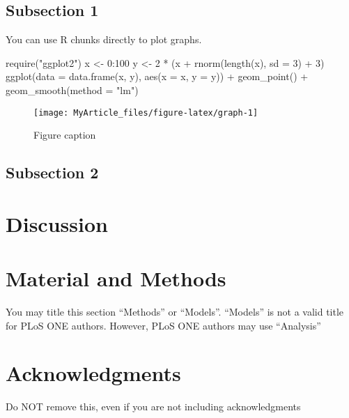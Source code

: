 \documentclass[10pt]{article}
\newenvironment{CodeChunk}{}{}
\begin{document}
\subsection*{Subsection 1}\label{subsection-1}

You can use R chunks directly to plot graphs.

\begin{CodeChunk}
\begin{CodeInput}
require("ggplot2")
x <- 0:100
y <- 2 * (x + rnorm(length(x), sd = 3) + 3)
ggplot(data = data.frame(x, y), 
       aes(x = x, y = y)) + 
  geom_point() + 
  geom_smooth(method = "lm")
\end{CodeInput}
\begin{figure}

{\centering \texttt{[image: MyArticle\_files/figure-latex/graph-1]} 

}

\caption[Figure caption]{Figure caption}\label{fig:graph}
\end{figure}
\end{CodeChunk}

\subsection*{Subsection 2}\label{subsection-2}

\section*{Discussion}\label{discussion}

\section*{Material and Methods}\label{material-and-methods}

You may title this section ``Methods'' or ``Models''. ``Models'' is not
a valid title for PLoS ONE authors. However, PLoS ONE authors may use
``Analysis''

\section*{Acknowledgments}\label{acknowledgments}

Do NOT remove this, even if you are not including acknowledgments
\end{document}
